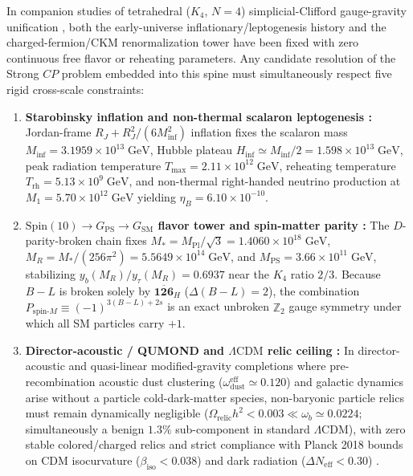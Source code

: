 \documentclass[11pt,a4paper]{article}
\begin{document}
In companion studies of tetrahedral ($K_4$, $N = 4$) simplicial-Clifford gauge-gravity unification \cite{Olcsak2026Zenodo,Olcsak2026Paper23,Olcsak2026Paper24,Olcsak2026Paper25}, both the early-universe inflationary/leptogenesis history and the charged-fermion/CKM renormalization tower have been fixed with zero continuous free flavor or reheating parameters. Any candidate resolution of the Strong $CP$ problem embedded into this spine must simultaneously respect five rigid cross-scale constraints:
\begin{enumerate}[label=\textbf{(C\arabic*)},leftmargin=2.4em,itemsep=2pt]
\item \textbf{Starobinsky inflation and non-thermal scalaron leptogenesis \cite{Starobinsky1980,Whitt1984,Olcsak2026Paper24}:} Jordan-frame $R_J + R_J^2/(6 M_{\mathrm{inf}}^2)$ inflation fixes the scalaron mass $M_{\mathrm{inf}} = 3.1959\times 10^{13}\;\mathrm{GeV}$, Hubble plateau $H_{\mathrm{inf}} \simeq M_{\mathrm{inf}}/2 = 1.598\times 10^{13}\;\mathrm{GeV}$, peak radiation temperature $T_{\max} = 2.11\times 10^{12}\;\mathrm{GeV}$, reheating temperature $T_{\mathrm{rh}} = 5.13\times 10^9\;\mathrm{GeV}$, and non-thermal right-handed neutrino production at $M_1 = 5.70\times 10^{12}\;\mathrm{GeV}$ yielding $\eta_B = 6.10\times 10^{-10}$.
\item \textbf{$\mathrm{Spin}(10) \to G_{\mathrm{PS}} \to G_{\mathrm{SM}}$ flavor tower and spin-matter parity \cite{Olcsak2026Paper25}:} The $D$-parity-broken chain fixes $M_* = M_{\mathrm{Pl}}/\sqrt{3} = 1.4060\times 10^{18}\;\mathrm{GeV}$, $M_R = M_*/(256\pi^2) = 5.5649\times 10^{14}\;\mathrm{GeV}$, and $M_{\mathrm{PS}} = 3.66\times 10^{11}\;\mathrm{GeV}$, stabilizing $y_b(M_R)/y_\tau(M_R) = 0.6937$ near the $K_4$ ratio $2/3$. Because $B-L$ is broken solely by $\overline{\mathbf{126}}_H$ ($\Delta(B-L) = 2$), the combination $P_{\mathrm{spin}\text{-}M} \equiv (-1)^{3(B-L)+2s}$ is an exact unbroken $\mathbb{Z}_2$ gauge symmetry under which all SM particles carry $+1$.
\item \textbf{Director-acoustic / QUMOND and $\Lambda\mathrm{CDM}$ relic ceiling \cite{Milgrom2010QUMOND,Olcsak2026Zenodo,Olcsak2026Paper23}:} In director-acoustic and quasi-linear modified-gravity completions where pre-recombination acoustic dust clustering ($\omega_{\mathrm{dust}}^{\mathrm{eff}} \simeq 0.120$) and galactic dynamics arise without a particle cold-dark-matter species, non-baryonic particle relics must remain dynamically negligible ($\Omega_{\mathrm{relic}} h^2 < 0.003 \ll \omega_b \simeq 0.0224$; simultaneously a benign $1.3\%$ sub-component in standard $\Lambda\mathrm{CDM}$), with zero stable colored/charged relics and strict compliance with Planck 2018 bounds on CDM isocurvature ($\beta_{\mathrm{iso}} < 0.038$) and dark radiation ($\Delta N_{\mathrm{eff}} < 0.30$) \cite{Planck2018Inflation,Planck2018Cosmo}.

\end{enumerate}
\end{document}
